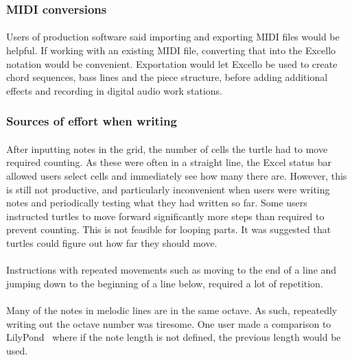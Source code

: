 \subsubsection{MIDI conversions}

\paragraph{} Users of production software said importing and exporting MIDI files would be helpful. If working with an existing MIDI file, converting that into the Excello notation would be convenient. Exportation would let Excello be used to create chord sequences, bass lines and the piece structure, before adding additional effects and recording in digital audio work stations.

\subsubsection{Sources of effort when writing}

\paragraph{} After inputting notes in the grid, the number of cells the turtle had to move required counting. As these were often in a straight line, the Excel status bar allowed users select cells and immediately see how many there are. However, this is still not productive, and particularly inconvenient when users were writing notes and periodically testing what they had written so far. Some users instructed turtles to move forward significantly more steps than required to prevent counting. This is not feasible for looping parts. It was suggested that turtles could figure out how far they should move.

\paragraph{} Instructions with repeated movements such as moving to the end of a line and jumping down to the beginning of a line below, required a lot of repetition.

\paragraph{} Many of the notes in melodic lines are in the same octave. As such, repeatedly writing out the octave number was tiresome. One user made a comparison to LilyPond~\cite{sandberg:lily} where if the note length is not defined, the previous length would be used.

